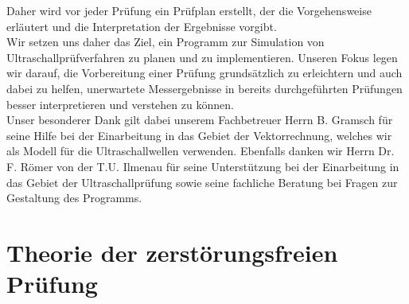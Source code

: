 \documentclass[reducespace,stylepage,semiarbeit]{spezidoc}
\begin{document}
Daher wird vor jeder Prüfung ein Prüfplan erstellt, der die Vorgehensweise erläutert und die Interpretation der Ergebnisse vorgibt.\\
Wir setzen uns daher das Ziel, ein Programm zur Simulation von Ultraschallprüfverfahren zu planen und zu implementieren. Unseren Fokus legen wir darauf, die Vorbereitung einer Prüfung grundsätzlich zu erleichtern und auch dabei zu helfen, unerwartete Messergebnisse in bereits durchgeführten Prüfungen besser interpretieren und verstehen zu können.\\
Unser besonderer Dank gilt dabei unserem Fachbetreuer Herrn B. Gramsch für seine Hilfe bei der Einarbeitung in das Gebiet der Vektorrechnung, welches wir als Modell für die Ultraschallwellen verwenden. Ebenfalls danken wir Herrn Dr. F. Römer von der T.U. Ilmenau für seine Unterstützung bei der Einarbeitung in das Gebiet der Ultraschallprüfung sowie seine fachliche Beratung bei Fragen zur Gestaltung des Programms. %

\newpage

\section{Theorie der zerstörungsfreien Prüfung}
\end{document}
